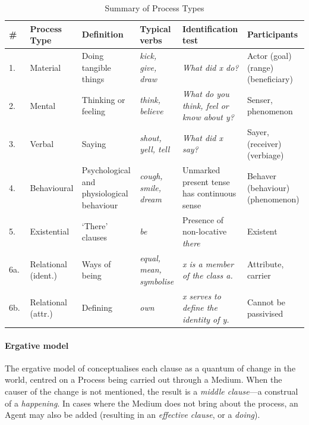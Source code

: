 \begin{table}[htb]
\begin{tabularx}{\textwidth}{lXXXXX}

\toprule
\#~ & Process Type & Definition & Typical verbs & Identification test & Participants \\ \midrule
1.  & Material       & Doing tangible things         & \emph{kick, give, draw}   & \emph{What did x do?}        & Actor (goal) (range) (beneficiary) \\
2.  & Mental         & Thinking or feeling           & \emph{think, believe}    & \emph{What do you think, feel or know about y?}      & Senser, phenomenon        \\
3.  & Verbal         & Saying            & \emph{shout, yell, tell}    & \emph{What did x say?}       & Sayer, (receiver) (verbiage)   \\
4.  & Behavioural       & Psychological and \newline physiological behaviour & \emph{cough, smile, dream}  & Unmarked present tense has continuous sense            & Behaver (behaviour) (phenomenon)    \\
5.  & Existential       & `There' clauses            & \emph{be }      & Presence of non-locative \emph{there}    & Existent       \\
6a. & Relational \newline (ident.)   & Ways of being           & \emph{equal, mean, symbolise}  &  \emph{x is a member of the class a.}    & Attribute, carrier      \\
6b. & Relational \newline (attr.)   & Defining             & \emph{own}      & \emph{x serves to define the identity of y.}   & Cannot be passivised     \\
\bottomrule
\end{tabularx} 
\caption{Summary of Process Types}
\label{tab:proctypeoverview}
\end{table}

\FloatBarrier
\paragraph{Ergative model}

The ergative model of  conceptualises each clause as a quantum of change in the world, centred on a Process being carried out through a Medium. When the causer of the change is not mentioned, the result is a \emph{middle clause}---a construal of a \emph{happening}. In cases where the Medium does not bring about the process, an Agent may also be added (resulting in an \emph{effective clause}, or a \emph{doing}).

